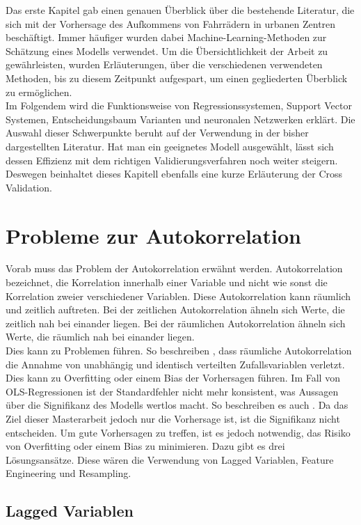 \documentclass[a4paper,12pt]{thesis}
\begin{document}
Das erste Kapitel gab einen genauen Überblick über die bestehende Literatur, die sich mit der Vorhersage des Aufkommens von Fahrrädern in urbanen Zentren beschäftigt. Immer häufiger wurden dabei Machine-Learning-Methoden zur Schätzung eines Modells verwendet. Um die Übersichtlichkeit der Arbeit zu gewährleisten, wurden Erläuterungen, über die verschiedenen verwendeten Methoden, bis zu diesem Zeitpunkt aufgespart, um einen gegliederten Überblick zu ermöglichen.\\
Im Folgendem wird die Funktionsweise von Regressionssystemen, Support Vector Systemen, Entscheidungsbaum Varianten und neuronalen Netzwerken erklärt. Die Auswahl dieser Schwerpunkte beruht auf der Verwendung in der bisher dargestellten Literatur. Hat man ein geeignetes Modell ausgewählt, lässt sich dessen Effizienz mit dem richtigen Validierungsverfahren noch weiter steigern. Deswegen beinhaltet dieses Kapitell ebenfalls eine kurze Erläuterung der Cross Validation.

\section{Probleme zur Autokorrelation}

Vorab muss das Problem der Autokorrelation erwähnt werden. Autokorrelation bezeichnet, die Korrelation innerhalb einer Variable und nicht wie sonst die Korrelation zweier verschiedener Variablen. Diese Autokorrelation kann räumlich und zeitlich auftreten. Bei der zeitlichen Autokorrelation ähneln sich Werte, die zeitlich nah bei einander liegen. Bei der räumlichen Autokorrelation ähneln sich Werte, die räumlich nah bei einander liegen.\\ 
Dies kann zu Problemen führen. So beschreiben \cite{LiuAutocorrelation2022}, dass räumliche Autokorrelation die Annahme von unabhängig und identisch verteilten Zufallsvariablen verletzt. Dies kann zu Overfitting oder einem Bias der Vorhersagen führen. Im Fall von OLS-Regressionen ist der Standardfehler nicht mehr konsistent, was Aussagen über die Signifikanz des Modells wertlos macht. So beschreiben es auch \cite{Stock2015b}. Da das Ziel dieser Masterarbeit jedoch nur die Vorhersage ist, ist die Signifikanz nicht entscheiden. Um gute Vorhersagen zu treffen, ist es jedoch notwendig, das Risiko von Overfitting oder einem Bias zu minimieren. Dazu gibt es drei Lösungsansätze. Diese wären die Verwendung von Lagged Variablen, Feature Engineering und Resampling.\\

\subsection{Lagged Variablen}
\end{document}
